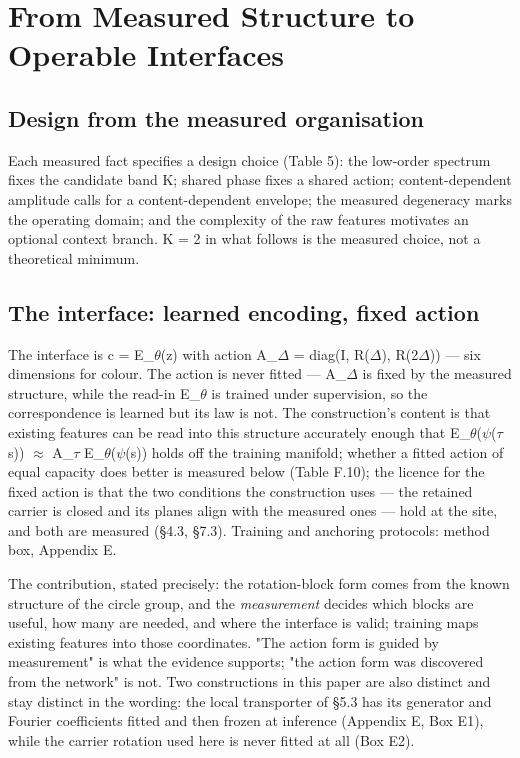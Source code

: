\section{From Measured Structure to Operable Interfaces}

\subsection{Design from the measured organisation}

Each measured fact specifies a design choice (Table 5): the low-order spectrum fixes the candidate band K; shared phase fixes a shared action; content-dependent amplitude calls for a content-dependent envelope; the measured degeneracy marks the operating domain; and the complexity of the raw features motivates an optional context branch. K = 2 in what follows is the measured choice, not a theoretical minimum.

\subsection{The interface: learned encoding, fixed action}

The interface is c = E\_$\theta$(z) with action A\_$\Delta$ = diag(I, R($\Delta$), R(2$\Delta$)) --- six dimensions for colour. The action is never fitted --- A\_$\Delta$ is fixed by the measured structure, while the read-in E\_$\theta$ is trained under supervision, so the correspondence is learned but its law is not. The construction's content is that existing features can be read into this structure accurately enough that E\_$\theta$($\psi$($\tau$s)) $\approx$ A\_$\tau$ E\_$\theta$($\psi$(s)) holds off the training manifold; whether a fitted action of equal capacity does better is measured below (Table F.10); the licence for the fixed action is that the two conditions the construction uses --- the retained carrier is closed and its planes align with the measured ones --- hold at the site, and both are measured (\S{}4.3, \S{}7.3). Training and anchoring protocols: method box, Appendix E.

The contribution, stated precisely: the rotation-block form comes from the known structure of the circle group, and the \textit{measurement} decides which blocks are useful, how many are needed, and where the interface is valid; training maps existing features into those coordinates. "The action form is guided by measurement" is what the evidence supports; "the action form was discovered from the network" is not. Two constructions in this paper are also distinct and stay distinct in the wording: the local transporter of \S{}5.3 has its generator and Fourier coefficients fitted and then frozen at inference (Appendix E, Box E1), while the carrier rotation used here is never fitted at all (Box E2).

